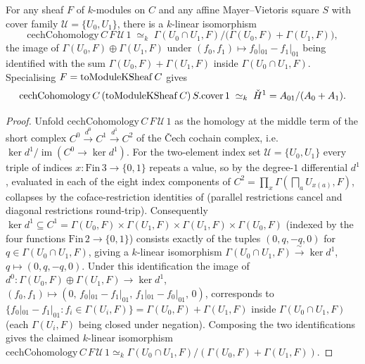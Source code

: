 \begin{proposition}
  \label{thm:adelic_cechH1_eq_cokernel}
  \leanok
  For any sheaf \(F\) of \(k\)-modules on \(C\) and any affine
  Mayer--Vietoris square \(S\) with cover family \(\mathcal U = \{U_0,
  U_1\}\), there is a \(k\)-linear isomorphism
  \[
    \mathrm{cechCohomology}\, C\, F\, \mathcal U\, 1
    \;\simeq_k\; \Gamma(U_0 \cap U_1, F) \big/
      \bigl(\Gamma(U_0, F) + \Gamma(U_1, F)\bigr),
  \]
  the image of \(\Gamma(U_0, F) \oplus \Gamma(U_1, F)\) under
  \((f_0, f_1) \mapsto f_0|_{01} - f_1|_{01}\) being identified with the
  sum \(\Gamma(U_0, F) + \Gamma(U_1, F)\) inside \(\Gamma(U_0 \cap U_1,
  F)\). Specialising \(F = \operatorname{toModuleKSheaf} C\) gives
  \[
    \mathrm{cechCohomology}\, C\, (\operatorname{toModuleKSheaf} C)\, S.\mathrm{cover}\, 1
      \;\simeq_k\; \check{H}^1 = A_{01}/(A_0 + A_1).
  \]
\end{proposition}
\begin{proof}
  \leanok
  Unfold \(\mathrm{cechCohomology}\, C\, F\, \mathcal U\, 1\) as the
  homology at the middle term of the short complex
  \(C^0 \xrightarrow{d^0} C^1 \xrightarrow{d^1} C^2\) of the Čech
  cochain complex, i.e.\ \(\ker d^1 / \operatorname{im}(C^0 \to \ker
  d^1)\). For the two-element index set \(\mathcal U = \{U_0, U_1\}\)
  every triple of indices \(x \colon \mathrm{Fin}\,3 \to \{0,1\}\)
  repeats a value, so by  the
  degree-\(1\) differential \(d^1\), evaluated in each of the eight
  index components of \(C^2 = \prod_x \Gamma(\bigsqcap_a
  U_{x(a)}, F)\), collapses by the coface-restriction identities of
   (parallel restrictions
  cancel and diagonal restrictions round-trip). Consequently
  \(\ker d^1 \subseteq C^1 = \Gamma(U_0, F) \times \Gamma(U_1, F) \times
  \Gamma(U_1, F) \times \Gamma(U_0, F)\) (indexed by the four functions
  \(\mathrm{Fin}\,2 \to \{0,1\}\)) consists exactly of the tuples
  \((0, q, -q, 0)\) for \(q \in \Gamma(U_0 \cap U_1, F)\), giving a
  \(k\)-linear isomorphism \(\Gamma(U_0 \cap U_1, F) \xrightarrow{\ \sim\
  } \ker d^1\), \(q \mapsto (0, q, -q, 0)\). Under this identification
  the image of \(d^0 \colon \Gamma(U_0, F) \oplus \Gamma(U_1, F) \to
  \ker d^1\), \((f_0, f_1) \mapsto (0,\, f_0|_{01} - f_1|_{01},\,
  f_1|_{01} - f_0|_{01},\, 0)\), corresponds to \(\{ f_0|_{01} -
  f_1|_{01} : f_i \in \Gamma(U_i, F)\} = \Gamma(U_0, F) + \Gamma(U_1,
  F)\) inside \(\Gamma(U_0 \cap U_1, F)\) (each \(\Gamma(U_i, F)\) being
  closed under negation). Composing the two identifications gives the
  claimed \(k\)-linear isomorphism
  \(\mathrm{cechCohomology}\, C\, F\, \mathcal U\, 1 \simeq_k
  \Gamma(U_0 \cap U_1, F)/(\Gamma(U_0, F) + \Gamma(U_1, F))\).
\end{proof}

